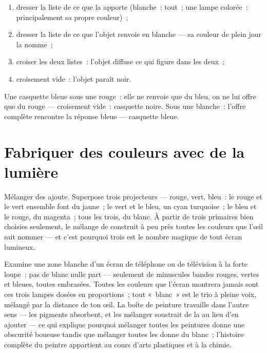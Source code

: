 \begin{method}\label{met:g8:colors-spectra:predict}
\begin{enumerate}
  \item dresser la liste de ce que la  apporte (blanche~:
        tout~; une lampe colorée~: principalement sa propre
        couleur)~;
  \item dresser la liste de ce que l'objet renvoie en 
        blanche --- sa couleur de plein jour la nomme~;
  \item croiser les deux listes~: l'objet diffuse ce qui figure
        dans les deux~;
  \item croisement vide~: l'objet paraît noir.
\end{enumerate}
Une casquette bleue sous une  rouge~: elle ne renvoie que du
bleu, on ne lui offre que du rouge --- croisement vide~: casquette
noire. Sous une  blanche~: l'offre complète rencontre la
réponse bleue --- casquette bleue.
\end{method}

\section{Fabriquer des couleurs avec de la lumière}

\begin{example}\label{ex:g8:colors-spectra:additive}
Mélanger des \emph{} ajoute. Superpose trois projecteurs ---
rouge, vert, bleu~: le rouge et le vert ensemble font du jaune~; le
vert et le bleu, un cyan turquoise~; le bleu et le rouge, du
magenta~; tous les trois, du blanc. À partir de trois primaires bien
choisies seulement, le mélange de  construit à peu près toutes
les couleurs que l'œil sait nommer --- et c'est pourquoi trois est le
nombre magique de tout écran lumineux.
\end{example}

\begin{example}\label{ex:g8:colors-spectra:screen}
Examine une zone blanche d'un écran de téléphone ou de télévision à la
forte loupe~: pas de blanc nulle part --- seulement de minuscules
bandes rouges, vertes et bleues, toutes embrasées. Toutes les couleurs
que l'écran montrera jamais sont ces trois lampes dosées en
proportions~; tout «~blanc~» est le trio à pleine voix, mélangé par la
distance de ton œil. La boîte de peinture travaille dans l'autre
sens --- les pigments absorbent, et les mélanger soustrait de la
 au lieu d'en ajouter --- ce qui explique pourquoi mélanger
toutes les peintures donne une obscurité boueuse tandis que mélanger
toutes les  donne du blanc~; l'histoire complète du peintre
appartient au cours d'arts plastiques et à la chimie.
\end{example}

